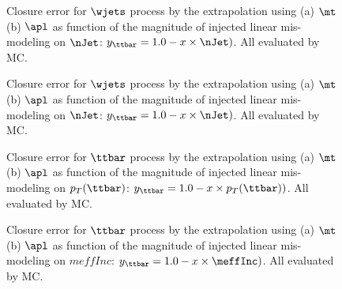 \begin{figure}[h]
  \centering
    \caption{ Closure error for $\wjets$ process by the extrapolation using (a) $\mt$ (b) $\apl$ as function of the magnitude of injected linear mis-modeling on $\nJet$: $y_{\ttbar} = 1.0 - x \times \nJet)$. All evaluated by MC.   \label{fig::BGestimation::valid_extp1} }
\end{figure}

\begin{figure}[h]
  \centering
    \caption{ Closure error for $\wjets$ process by the extrapolation using (a) $\mt$ (b) $\apl$ as function of the magnitude of injected linear mis-modeling on $\nJet$: $y_{\ttbar} = 1.0 - x \times \nJet)$. All evaluated by MC.   \label{fig::BGestimation::valid_extp2} }
\end{figure}


\begin{figure}[h]
  \centering
    \caption{ Closure error for $\ttbar$ process by the extrapolation using (a) $\mt$ (b) $\apl$ as function of the magnitude of injected linear mis-modeling on $p_T(\ttbar)$: $y_{\ttbar} = 1.0 - x \times p_T(\ttbar))$. All evaluated by MC.   \label{fig::BGestimation::valid_extp1} }
\end{figure}

\begin{figure}[h]
  \centering
    \caption{ Closure error for $\ttbar$ process by the extrapolation using (a) $\mt$ (b) $\apl$ as function of the magnitude of injected linear mis-modeling on $meffInc$: $y_{\ttbar} = 1.0 - x \times \meffInc)$. All evaluated by MC.   \label{fig::BGestimation::valid_extp1} }
\end{figure}


